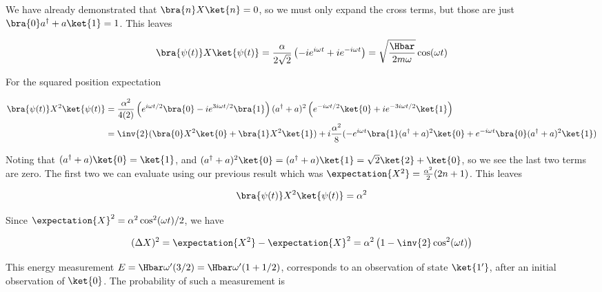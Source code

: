 {We have already demonstrated that \(\bra{n} X \ket{n} = 0\), so we must only expand the cross terms, but those are just \(\bra{0} a^\dagger + a \ket{1} = 1\).  This leaves 

\begin{equation}\label{eqn:qmIexamPractice2008Dec:3:310}
\bra{\psi(t)} X \ket{\psi(t)}
= 
\frac{\alpha}{2 \sqrt{2}}
\left( -i e^{i \omega t} + i e^{-i \omega t} \right)
=
\sqrt{\frac{\Hbar}{2 m \omega}} \cos(\omega t)
\end{equation}

For the squared position expectation

\begin{equation}\label{eqn:qmIexamPractice:770}
\begin{aligned}
\bra{\psi(t)} X^2 \ket{\psi(t)}
&= 
\frac{\alpha^2}{4 (2)}
\left(
e^{i \omega t/2 } \bra{0}
- i e^{ 3 i \omega t/2 } \bra{1}
\right)
(a^\dagger + a)^2
\left(
e^{-i \omega t/2 } \ket{0}
+ i e^{- 3 i \omega t/2 } \ket{1}
\right) \\
&=
\inv{2} ( \bra{0} X^2 \ket{0} + \bra{1} X^2 \ket{1} )
+ i \frac{\alpha^2 }{8} ( 
- e^{ i \omega t} \bra{1} (a^\dagger + a)^2 \ket{0}
+ e^{ -i \omega t} \bra{0} (a^\dagger + a)^2 \ket{1}
)
\end{aligned}
\end{equation}

Noting that \((a^\dagger + a) \ket{0} = \ket{1}\), and \((a^\dagger + a)^2 \ket{0} = (a^\dagger + a)\ket{1} = \sqrt{2} \ket{2} + \ket{0}\), so we see the last two terms are zero.  The first two we can evaluate using our previous result  which was \(\expectation{X^2} = \frac{\alpha^2}{2} (2n + 1)\).  This leaves

\begin{equation}\label{eqn:qmIexamPractice2008Dec:3:330}
\bra{\psi(t)} X^2 \ket{\psi(t)} = \alpha^2 
\end{equation}

Since \(\expectation{X}^2 = \alpha^2 \cos^2(\omega t)/2\), we have

\begin{equation}\label{eqn:qmIexamPractice2008Dec:3:340}
(\Delta X)^2 = \expectation{X^2} - \expectation{X}^2 = \alpha^2 \left(1 - \inv{2} \cos^2(\omega t) \right)
\end{equation}


This energy measurement \(E = \Hbar \omega' (3/2) = \Hbar \omega' (1 + 1/2)\), corresponds to an observation of state \(\ket{1'}\), after an initial observation of \(\ket{0}\).  The probability of such a measurement is

}
